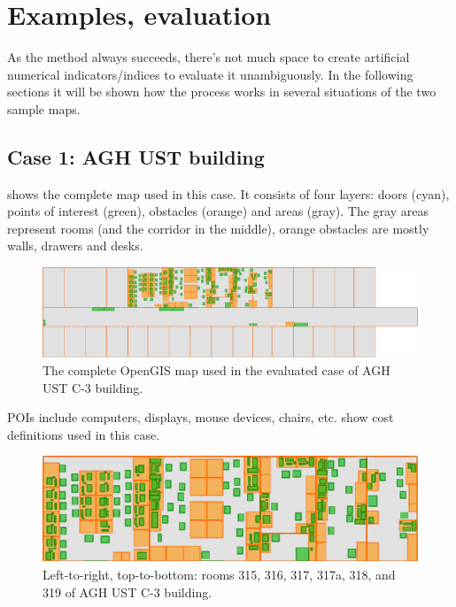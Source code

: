 \chapter{Examples, evaluation}
\label{cha:evaluation}

As the method always succeeds, there's not much space to create artificial numerical indicators/indices to evaluate it unambiguously. In the following sections it will be shown how the process works in several situations of the two sample maps.

\section{Case 1: AGH UST building}
\label{sec:case-agh}

 shows the complete map used in this case. It consists of four layers: doors (cyan), points of interest (green), obstacles (orange) and areas (gray). The gray areas represent rooms (and the corridor in the middle), orange obstacles are mostly walls, drawers and desks. \begin{figure}[h]
	\centering
	\includegraphics[width=\textwidth]{case-agh-complete}
	\caption{The complete OpenGIS map used in the evaluated case of AGH UST C-3 building.}
	\label{fig:case-agh-complete}
\end{figure} POIs include computers, displays, mouse devices, chairs, etc.  show cost definitions used in this case.

\begin{figure}
	\centering
	\includegraphics[width=\textwidth]{case-agh-rooms}
	\caption{Left-to-right, top-to-bottom: rooms 315, 316, 317, 317a, 318, and 319 of AGH UST C-3 building.}
	\label{fig:case-agh-rooms}
\end{figure}

